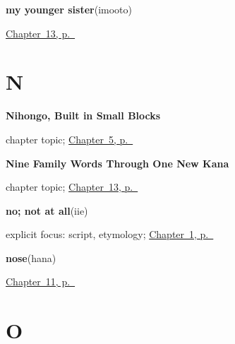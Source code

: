 \noindent\begin{minipage}[t]{\linewidth}
\raggedright
\textbf{my younger sister}\enspace\emph{}\enspace(imooto)\par
\footnotesize \hyperref[ch:ja-family-nine]{Chapter~13, p.~\pageref*{ch:ja-family-nine}}
\end{minipage}\par\smallskip

\section*{N}

\noindent\begin{minipage}[t]{\linewidth}
\raggedright
\textbf{Nihongo, Built in Small Blocks}\par
\footnotesize chapter topic; \hyperref[ch:ja-nihongo-kanji]{Chapter~5, p.~\pageref*{ch:ja-nihongo-kanji}}
\end{minipage}\par\smallskip

\noindent\begin{minipage}[t]{\linewidth}
\raggedright
\textbf{Nine Family Words Through One New Kana}\par
\footnotesize chapter topic; \hyperref[ch:ja-family-nine]{Chapter~13, p.~\pageref*{ch:ja-family-nine}}
\end{minipage}\par\smallskip

\noindent\begin{minipage}[t]{\linewidth}
\raggedright
\textbf{no; not at all}\enspace\emph{}\enspace(iie)\par
\footnotesize explicit focus: script, etymology; \hyperref[ch:ja-two-answers]{Chapter~1, p.~\pageref*{ch:ja-two-answers}}
\end{minipage}\par\smallskip

\noindent\begin{minipage}[t]{\linewidth}
\raggedright
\textbf{nose}\enspace\emph{}\enspace(hana)\par
\footnotesize \hyperref[ch:ja-body-seven]{Chapter~11, p.~\pageref*{ch:ja-body-seven}}
\end{minipage}\par\smallskip

\section*{O}

